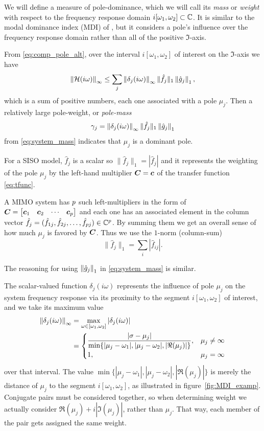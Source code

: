  We will define a measure of pole-dominance, which we will call its \emph{mass} or \emph{weight} with respect to the frequency response domain $i[\omega_1,\omega_2]\subset\C$.  It is similar to the modal dominance index (MDI) of \cite{Aguirre}, but it considers a pole's influence over the frequency response domain rather than all of the positive $\Im$-axis. 

 From \eqref{eq:comp_pole_alt}, over the interval $i[\omega_1,\omega_2]$ of interest on the $\Im$-axis we have 
\begin{equation}
\nrm{\infty}{\tf(i\omega)} \leq  \sum_j \nrm{\infty}{\delta_j(i\omega)} \|\hat{f}_j\|_1 \nrm{1}{\hat{g}_j},
\label{eq:system_mass}
\end{equation}
which is a sum of positive numbers, each one associated with a pole $\mu_j$.  Then a relatively large pole-weight, or \emph{pole-mass} 
\begin{equation}
\gamma_j =  \nrm{\infty}{\delta_j(i\omega)} \|\hat{f}_j\|_1 \nrm{1}{\hat{g}_j}
\label{eq:pole_weight}
\end{equation}
from \eqref{eq:system_mass}  indicates that $\mu_j$ is a dominant pole.   

For a SISO model, $\hat{f}_j$ is a scalar so $\|\hat{f}_j\|_1=|\hat{f}_j|$ and it represents the weighting of the pole $\mu_j$ by the left-hand multiplier $\CC=\Cc$ of the transfer function \eqref{eq:tfunc}.   

A MIMO system has $\nout$ such left-multipliers in the form of $\CC=\mat{\Cc_1 & \Cc_2 &\cdots&\Cc_\nout}$ and each one has an associated element in the column vector $\hat{f}_j=(\hat{f}_{1j},\hat{f}_{2j},\dots,\hat{f}_{\nout j}) \in\C^\nout$.  By summing them we get an overall sense of how much $\mu_j$ is favored by $\CC$.   Thus we use the $1$-norm (column-sum)  
\[
\|\hat{f}_j\|_1 = \sum_i |\hat{f}_{ij}|.
\]

 The reasoning for using $\nrm{1}{\hat{g}_j}$ in \eqref{eq:system_mass} is similar.  

The scalar-valued function $\delta_j(i\omega)$ represents the influence of pole $\mu_j$ on the system frequency response via its proximity to the segment $i[\omega_1,\omega_2]$ of interest, and we take its maximum value 
\begin{align}
\nrm{\infty}{\delta_j(i\omega)} &= \max_{\omega\in [\omega_1,\omega_2]}| \delta_j(i\omega)|\nonumber\\
&= \begin{cases}
\dfrac{| \xp-\mu_j|}{\min\{|\mu_j-\omega_1|,|\mu_j -\omega_2|,|\Re(\mu_j)|  \}},   & \mu_j \neq \infty\\
1, & \mu_j = \infty
\end{cases}
\label{eq:pole_wt_delta}
\end{align}
over that interval.
The value $\min\{|\mu_j-\omega_1|,|\mu_j -\omega_2|,|\Re(\mu_j)|  \}$ is merely the distance of $\mu_j$ to the segment $i[\omega_1,\omega_2]$, as illustrated in figure~\ref{fig:MDI_examp}.  Conjugate pairs must be considered together, so when determining weight we actually consider $\Re(\mu_j)+ i|\Im(\mu_j) |$, rather than $\mu_j$. That way, each member of the pair gets assigned the same weight.

